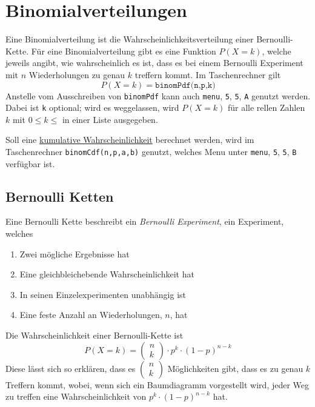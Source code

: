 \documentclass{article}
\begin{document}
\section{Binomialverteilungen}
Eine Binomialverteilung ist die Wahrscheinlichkeitsverteilung einer Bernoulli-Kette. Für eine Binomialverteilung gibt es eine Funktion $P(X=k)$, welche jeweils angibt, wie wahrscheinlich es ist, dass es bei einem Bernoulli Experiment mit $n$ Wiederholungen zu genau $k$ treffern kommt. Im Taschenrechner gilt 
\[
 P(X=k)=\texttt{binomPdf(n,p,k)}
\]
Anstelle vom Ausschreiben von \texttt{binomPdf} kann auch \texttt{menu}, \texttt{5}, \texttt{5}, \texttt{A} genutzt werden. Dabei ist \texttt{k} optional; wird es weggelassen, wird $P(X=k)$ für alle rellen Zahlen $k$ mit $0 \leq k \leq$ in einer Liste ausgegeben.
 
Soll eine \hyperref[Kumulative Wahrscheinlichkeiten]{kumulative Wahrscheinlichkeit} berechnet werden, wird im Taschenrechner \texttt{binomCdf(n,p,a,b)} genutzt, welches Menu unter \texttt{menu}, \texttt{5}, \texttt{5}, \texttt{B} verfügbar ist.
 
\subsection{Bernoulli Ketten}
Eine Bernoulli Kette beschreibt ein \emph{Bernoulli Experiment}, ein Experiment, welches
\begin{enumerate}
 \item Zwei mögliche Ergebnisse hat
 \item Eine gleichbleichebende Wahrscheinlichkeit hat
 \item In seinen Einzelexperimenten unabhängig ist
 \item Eine feste Anzahl an Wiederholungen, $n$, hat 
\end{enumerate} 
Die Wahrscheinlichkeit einer Bernoulli-Kette ist
\[
 P(X=k) =
 \begin{pmatrix} n \\ k \end{pmatrix} \cdot
 p^k \cdot (1-p)^{n-k}
\]
Diese lässt sich so erklären, dass es $\begin{pmatrix} n \\ k \end{pmatrix}$ Möglichkeiten gibt, dass es zu genau $k$ Treffern kommt, wobei, wenn sich ein Baumdiagramm vorgestellt wird, jeder Weg zu treffen eine Wahrscheinlichkeit von $p^k \cdot (1-p)^{n-k}$ hat.
\end{document}
